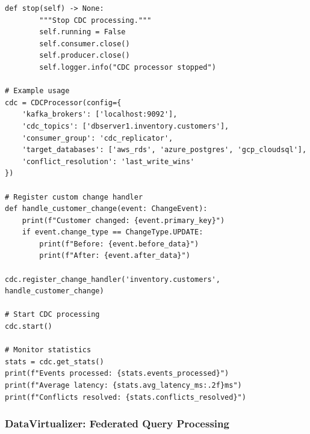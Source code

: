 \begin{lstlisting}[style=python, caption=CDCProcessor with Change Stream Handling]
    def stop(self) -> None:
        """Stop CDC processing."""
        self.running = False
        self.consumer.close()
        self.producer.close()
        self.logger.info("CDC processor stopped")

# Example usage
cdc = CDCProcessor(config={
    'kafka_brokers': ['localhost:9092'],
    'cdc_topics': ['dbserver1.inventory.customers'],
    'consumer_group': 'cdc_replicator',
    'target_databases': ['aws_rds', 'azure_postgres', 'gcp_cloudsql'],
    'conflict_resolution': 'last_write_wins'
})

# Register custom change handler
def handle_customer_change(event: ChangeEvent):
    print(f"Customer changed: {event.primary_key}")
    if event.change_type == ChangeType.UPDATE:
        print(f"Before: {event.before_data}")
        print(f"After: {event.after_data}")

cdc.register_change_handler('inventory.customers', handle_customer_change)

# Start CDC processing
cdc.start()

# Monitor statistics
stats = cdc.get_stats()
print(f"Events processed: {stats.events_processed}")
print(f"Average latency: {stats.avg_latency_ms:.2f}ms")
print(f"Conflicts resolved: {stats.conflicts_resolved}")
\end{lstlisting}

\subsubsection{DataVirtualizer: Federated Query Processing}

